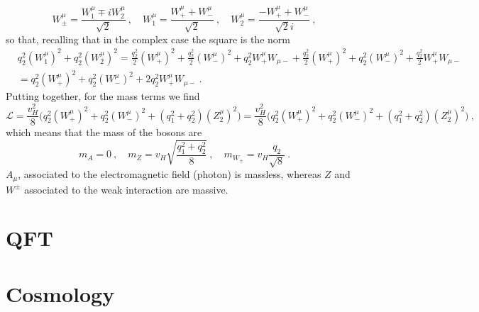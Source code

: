     \begin{equation*}
        W_\pm^\mu = \frac{W_1^\mu \mp i W_2^\mu}{\sqrt{2}} ~, \quad W^\mu_1 = \frac{W_+^\mu + W_-^\mu}{\sqrt{2}} ~, \quad W^\mu_2 = \frac{ - W_+^\mu + W_-^\mu}{\sqrt{2} i} ~,
    \end{equation*}
    so that, recalling that in the complex case the square is the norm
    \begin{equation*}
    \begin{aligned}
        & q_2^2 (W^\mu_1)^2 + q_2^2 (W^\mu_2)^2 =  \frac{q_2^2}{2} (W^\mu_+)^2 + \frac{q_2^2}{2} (W^\mu_-)^2 + q_2^2 W^\mu_+ W_{\mu -} + \frac{q_2^2}{2} (W^\mu_+)^2 + q_2^2 (W^\mu_-)^2 + \frac{q_2^2}{2} W^\mu_+ W_{\mu -} \\ & = q_2^2 (W^\mu_+)^2 + q_2^2 (W^\mu_-)^2 + 2 q_2^2 W^\mu_+ W_{\mu -} ~.
    \end{aligned}
    \end{equation*}
    Putting together, for the mass terms we find
    \begin{equation*}
        \mathcal L = \frac{v_H^2}{8} \Big ( q_2^2 (W^\mu_+)^2 + q_2^2 (W^\mu_-)^2 + (q_1^2 + q_2^2) (Z^\mu_2)^2 \Big ) = \frac{v_H^2}{8} \Big ( q_2^2 (W^\mu_+)^2 + q_2^2 (W^\mu_-)^2 + (q_1^2 + q_2^2) (Z^\mu_2)^2 \Big ) ~,
    \end{equation*}
    which means that the mass of the bosons are 
    \begin{equation*}
        m_A = 0 ~, \quad m_Z = v_H \sqrt{\frac{q_1^2 + q_2^2}{8}} ~, \quad m_{W_\pm} = v_H \frac{q_2}{\sqrt{8}} ~.
    \end{equation*}
    $A_\mu$, associated to the electromagnetic field (photon) is massless, whereas $Z$ and $W^\pm$ associated to the weak interaction are massive.













\chapter{QFT}

\chapter{Cosmology}
